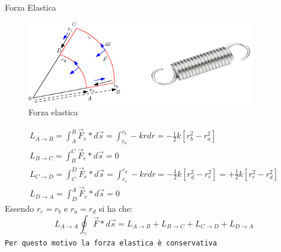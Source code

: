 \begin{esempio}
  Forza Elastica
  \begin{figure}[th]
    \centering
    \includegraphics[width=10cm]{img/finiti/forza_elastica_es.eps}
    \caption{Forza elastica}
  \end{figure}
  \begin{eqnarray*}
    L_{A\to B}=\int_{A}^{B}\vec{F}_e*d\vec{s}=\int_{r_a}^{r_b} -krdr=-\frac{1}{2}k
    [r_b^2-r_a^2]\\
    L_{B\to C}=\int_{B}^{C}\vec{F}_e*d\vec{s}=0\\
    L_{C\to D}=\int_{C}^{D}\vec{F}_e*d\vec{s}=\int_{r_c}^{r_d} -krdr=-\frac{1}{2}k
    [r_d^2-r_c^2]=+\frac{1}{2}k [r_c^2-r_d^2]\\
    L_{D\to A}=\int_{D}^{A}\vec{F}_e*d\vec{s}=0
  \end{eqnarray*}
  Essendo $r_c=r_b$ e $r_a=r_d$ si ha che:
  \begin{equation}
    L_{A\to A}\oint_\gamma \vec{F}* d\vec{s}=L_{A\to B}+L_{B\to C}+L_{C\to D}+L_{D\to A}
  \end{equation}
  {\tt Per questo motivo la forza elastica è conservativa}
\end{esempio}
